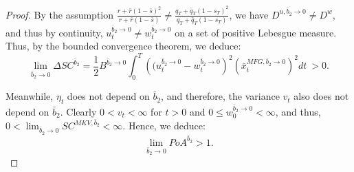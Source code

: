 \documentclass[11pt]{article}
\begin{document}
\begin{proof}
   	By the assumption $\frac{r + \bar{r}(1- \bar{s})^2}{r + \bar{r}(1-\bar{s})} \neq \frac{q_T+\bar{q}_T(1-s_T)^2}{q_T+\bar{q}_T(1-s_T)}$, we have $D^{u,\bar{b}_2 \to 0} \neq D^{w}$, and thus by continuity, $u^{\bar{b}_2 \to 0}_t\neq w^{\bar{b}_2 \to 0}_t$ on a set of positive Lebesgue measure. 
   	 Thus, by the bounded convergence theorem, we deduce:
	\begin{equation}
	\lim_{\bar{b}_2 \to 0} \Delta SC^{\bar{b}_2} = \frac{1}{2} B^{\bar{b}_2 \to 0} \int_0^T \left( (u_t^{\bar{b}_2 \to 0} - w_t^{\bar{b}_2 \to 0}\right)^2 \left (\bar{x}_t^{MFG,\bar{b}_2 \to 0} \right)^2 dt \  > 0.
	\label{eq:prop_6_bounded_conv}
	\end{equation}	
	
	Meanwhile, $\eta_t$ does not depend on $\bar{b}_2$, and therefore, the variance $v_t$ also does not depend on $\bar{b}_2$. Clearly $0<v_t<\infty$ for $t>0$ and $0 \leq w^{\bar{b}_2 \to 0}_0 < \infty$, and thus,
	$ 0<\lim_{\bar{b}_2 \to 0}SC^{MKV,\bar{b}_2} <\infty.$
	Hence, we deduce:
	$$ \lim_{\bar{b}_2 \to 0} PoA^{\bar{b}_2} > 1. $$
\end{proof}
\end{document}
